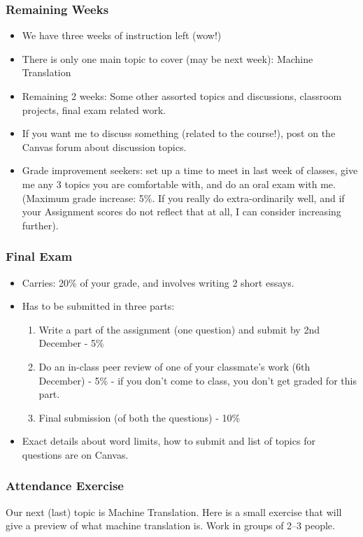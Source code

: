 \documentclass{beamer}
\begin{document}
\begin{frame}
\frametitle{Remaining Weeks}
\begin{itemize}
\item We have three weeks of instruction left (wow!) 
\item There is only one main topic to cover (may be next week): Machine Translation
\item Remaining 2 weeks: Some other assorted topics and discussions, classroom projects, final exam related work.
\item If you want me to discuss something (related to the course!), post on the Canvas forum about discussion topics. 
\item Grade improvement seekers: set up a time to meet in last week of classes, give me any 3 topics you are comfortable with, and do an oral exam with me. (Maximum grade increase: 5\%. If you really do extra-ordinarily well, and if your Assignment scores do not reflect that at all, I can consider increasing further).
\end{itemize}
\end{frame}

\begin{frame}
\frametitle{Final Exam}
\begin{itemize}
\item Carries: 20\% of your grade, and involves writing 2 short essays. 
\item Has to be submitted in three parts:
\begin{enumerate}
\item Write a part of the assignment (one question) and submit by 2nd December - 5\%
\item Do an in-class peer review of one of your classmate's work (6th December) - 5\% - if you don't come to class, you don't get graded for this part.
\item Final submission (of both the questions) - 10\%
\end{enumerate}
\item Exact details about word limits, how to submit and list of topics for questions are on Canvas. 
\end{itemize}
\end{frame}

\begin{frame}
\frametitle{Attendance Exercise}
Our next (last) topic is Machine Translation. Here is a small exercise that will give a preview of what machine translation is. Work in groups of 2--3 people.
\end{frame}
\end{document}
